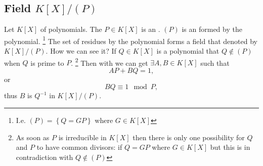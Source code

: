 \subsection{Field $K\left[X\right]/\left(P\right)$}
\label{lec1_sec14}
Let $K\left[X\right]$  of polynomials.
The $P \in K\left[X\right]$ is an
. $\left(P\right)$ is an 
 formed by the polynomial.
\footnote{
  I.e.
  \(
  \left(P\right) = \left\{ Q = G P \right\} 
  \)
  where $G \in K\left[X\right]$
}
The set of residues by
the polynomial forms a field that denoted by
$K\left[X\right]/\left(P\right)$. How we can see it?
If $Q \in K\left[X\right]$ is a polynomial that $Q \notin
\left(P\right)$ when $Q$ is prime to $P$.
\footnote{
  As soon as $P$ is irreducible in $K\left[X\right]$ then there is only
  one possibility for $Q$ and $P$ to have common divisors: if $Q = G P$
  where $G \in K\left[X\right]$ but this is in contradiction with
  $Q \notin \left(P\right)$
}
Then with
 we can get $\exists A, B \in K\left[X\right]$
such that
\[
A P + B Q = 1,
\]
or
\[
B Q \equiv 1 \mod P,
\]
thus $B$ is $Q^{-1}$ in $K\left[X\right]/\left(P\right)$.

